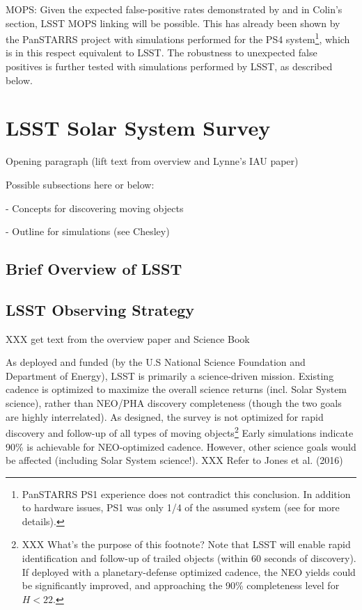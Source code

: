 \documentclass[12pt,preprint]{aastex}
\begin{document}
MOPS: Given the expected false-positive rates demonstrated by
\cite{goldstein15} and in Colin's  section, LSST MOPS linking will
be possible. This has already been shown by the PanSTARRS project 
with simulations performed for the PS4 system\footnote{PanSTARRS 
PS1 experience does not contradict this conclusion. In addition to 
hardware issues, PS1 was only 1/4 of the assumed system (see 
\citep{denneau13} for more details). }, which is in this
respect equivalent to LSST. The robustness to unexpected false
positives is further tested with simulations performed by LSST,
as described below. 







\section{LSST Solar System Survey} 

Opening paragraph  (lift text from overview and Lynne's IAU paper) 

Possible subsections here or below:

- Concepts for discovering moving objects

- Outline for simulations (see Chesley) 




\subsection{Brief Overview of LSST} 
% 

\subsection{LSST Observing Strategy} 

XXX get text from the overview paper and Science Book 

As deployed and funded (by the U.S National Science Foundation and
Department of Energy), LSST is primarily a science-driven mission. 
Existing cadence is optimized to maximize the overall science returns
(incl. Solar System science), rather than NEO/PHA discovery
completeness (though the two goals are highly interrelated).  As designed, the survey is not optimized for rapid
discovery and follow-up of all types of moving objects\footnote{
XXX What's the purpose of this footnote? Note that LSST will enable rapid identification and follow-up of
trailed objects (within 60 seconds of discovery). If deployed with a 
planetary-defense optimized cadence, the NEO yields could be
significantly improved, and approaching the 90\% completeness level
for $H<22$.} 
Early simulations indicate 90\% is achievable for NEO-optimized
cadence. However, other science goals would be affected (including
Solar System science!).  XXX Refer to Jones et al.  (2016) 
\end{document}
